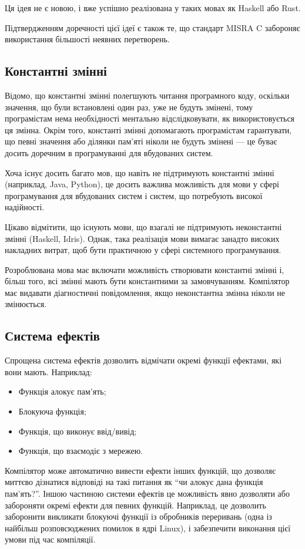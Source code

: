 \documentclass[main.tex]{subfiles}
\begin{document}
Ця ідея не є новою, і вже успішно реалізована у таких мовах як Haskell або Rust.

Підтвердженням доречності цієї ідеї є також те, що стандарт MISRA C забороняє використання більшості неявних перетворень.

\subsection{Константні змінні}
Відомо, що константні змінні полегшують читання програмного коду, оскільки значення, що були встановлені один раз, уже не будуть змінені, тому програмістам нема необхідності ментально відслідковувати, як використовується ця змінна. Окрім того, константі змінні допомагають програмістам гарантувати, що певні значення або ділянки пам'яті ніколи не будуть змінені --- це буває досить доречним в програмуванні для вбудованих систем.

Хоча існує досить багато мов, що навіть не підтримують константні змінні (наприклад, Java, Python), це досить важлива можливість для мови у сфері програмування для вбудованих систем і систем, що потребують високої надійності.

Цікаво відмітити, що існують мови, що взагалі не підтримують неконстантні змінні (Haskell, Idris). Однак, така реалізація мови вимагає занадто високих накладних витрат, щоб бути практичною у сфері системного програмування.

Розроблювана мова має включати можливість створювати константні змінні і, більш того, всі змінні мають бути константними за замовчуванням. Компілятор має видавати діагностичні повідомлення, якщо неконстантна змінна ніколи не змінюється.

\subsection{Система ефектів}
Спрощена система ефектів дозволить відмічати окремі функції ефектами, які вони мають. Наприклад:
\begin{itemize}[nosep]
\item Функція алокує пам'ять;
\item Блокуюча функція;
\item Функція, що виконує ввід/вивід;
\item Функція, що взаємодіє з мережею.
\end{itemize}

Компілятор може автоматично вивести ефекти інших функцій, що дозволяє миттєво дізнатися відповіді на такі питання як ``чи алокує дана функція пам'ять?''. Іншою частиною системи ефектів це можливість явно дозволяти або забороняти окремі ефекти для певних функцій. Наприклад, це дозволить заборонити викликати блокуючі функції із обробників переривань (одна із найбільш розповсюджених помилок в ядрі Linux), і забезпечити виконання цієї умови під час компіляції.
\end{document}
